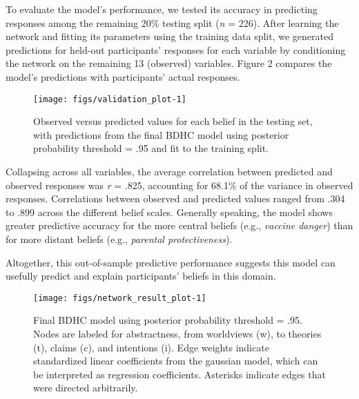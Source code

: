 \documentclass[10pt, letterpaper]{article}
\newenvironment{CodeChunk}{}{}
\begin{document}
To evaluate the model's performance, we tested its accuracy in
predicting responses among the remaining 20\% testing split (\emph{n} =
226). After learning the network and fitting its parameters using the
training data split, we generated predictions for held-out participants'
responses for each variable by conditioning the network on the remaining
13 (observed) variables. Figure 2 compares the model's predictions with
participants' actual responses.

\begin{CodeChunk}
\begin{figure*}[h]

{\centering \texttt{[image: figs/validation\_plot-1]} 

}

\caption[Observed versus predicted values for each belief in the testing set, with predictions from the final BDHC model using posterior probability threshold = .95 and fit to the training split]{Observed versus predicted values for each belief in the testing set, with predictions from the final BDHC model using posterior probability threshold = .95 and fit to the training split.}\label{fig:validation_plot}
\end{figure*}
\end{CodeChunk}

Collapsing across all variables, the average correlation between
predicted and observed responses was \emph{r} = .825, accounting for
68.1\% of the variance in observed responses. Correlations between
observed and predicted values ranged from .304 to .899 across the
different belief scales. Generally speaking, the model shows greater
predictive accuracy for the more central beliefs (e.g., \emph{vaccine
danger}) than for more distant beliefs (e.g., \emph{parental
protectiveness}).

Altogether, this out-of-sample predictive performance suggests this
model can usefully predict and explain participants' beliefs in this
domain.

\begin{CodeChunk}
\begin{figure*}[h]

{\centering \texttt{[image: figs/network\_result\_plot-1]} 

}

\caption[Final BDHC model using posterior probability threshold = .95]{Final BDHC model using posterior probability threshold = .95. Nodes are labeled for abstractness, from worldviews (w), to theories (t), claims (c), and intentions (i). Edge weights indicate standardized linear coefficients from the gaussian model, which can be interpreted as regression coefficients. Asterisks indicate edges that were directed arbitrarily.}\label{fig:network_result_plot}
\end{figure*}
\end{CodeChunk}
\end{document}
